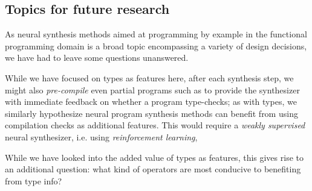 \documentclass{article} %
\begin{document}
\vspace{-10pt}
\subsection{Topics for future research}
\vspace{-5pt}

As neural synthesis methods aimed at programming by example in the functional
programming domain is a broad topic encompassing a variety of design decisions,
we have had to leave some questions unanswered.


    While we have focused on types as features here,
    after each synthesis step,
    we might also \emph{pre-compile} even partial programs such as to provide the synthesizer with immediate feedback on whether a program type-checks;
    as with types, we similarly hypothesize neural program synthesis methods can benefit from using compilation checks as additional features.
    This would require a \emph{weakly supervised} neural synthesizer,
    i.e. using \emph{reinforcement learning},

    While we have looked into the added value of types as features,
    this gives rise to an additional question:
    what kind of operators are most conducive to benefiting from type info?

\end{document}
